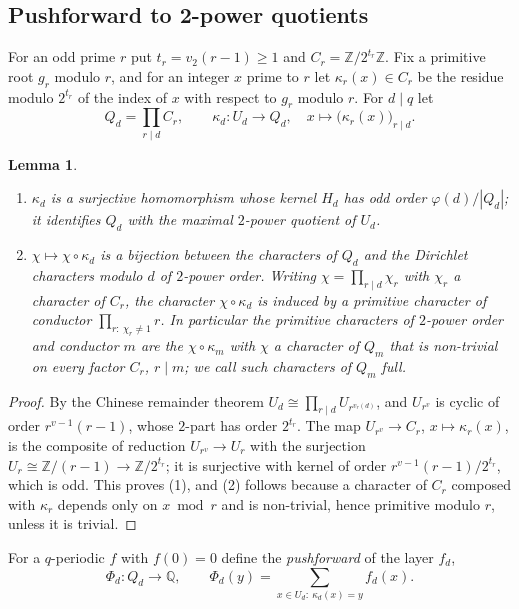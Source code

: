 \documentclass[11pt]{amsart}
\newtheorem{lemma}[theorem]{Lemma}
\theoremstyle{definition}
\theoremstyle{remark}
\providecommand{\Q}{\mathbb Q}
\providecommand{\Z}{\mathbb Z}
\numberwithin{equation}{section}
\begin{document}
\subsection{Pushforward to 2-power quotients}
For an odd prime $r$ put $t_r=v_2(r-1)\ge1$ and $C_r=\Z/2^{t_r}\Z$.
Fix a primitive root $g_r$ modulo $r$, and for an integer $x$ prime to $r$ let $\kappa_r(x)\in C_r$ be the residue modulo $2^{t_r}$ of the index of $x$ with respect to $g_r$ modulo $r$.
For $d\mid q$ let
\[
Q_d=\prod_{r\mid d}C_r,\qquad \kappa_d\colon U_d\to Q_d,\quad x\mapsto\bigl(\kappa_r(x)\bigr)_{r\mid d}.
\]

\begin{lemma}\label{lem:quotient}
\begin{enumerate}
\item $\kappa_d$ is a surjective homomorphism whose kernel $H_d$ has odd order $\varphi(d)/|Q_d|$; it identifies $Q_d$ with the maximal $2$-power quotient of $U_d$.
\item $\chi\mapsto\chi\circ\kappa_d$ is a bijection between the characters of $Q_d$ and the Dirichlet characters modulo $d$ of $2$-power order.
Writing $\chi=\prod_{r\mid d}\chi_r$ with $\chi_r$ a character of $C_r$, the character $\chi\circ\kappa_d$ is induced by a primitive character of conductor $\prod_{r:\ \chi_r\neq1}r$.
In particular the primitive characters of $2$-power order and conductor $m$ are the $\chi\circ\kappa_m$ with $\chi$ a character of $Q_m$ that is non-trivial on every factor $C_r$, $r\mid m$; we call such characters of $Q_m$ \emph{full}.
\end{enumerate}
\end{lemma}

\begin{proof}
By the Chinese remainder theorem $U_d\cong\prod_{r\mid d}U_{r^{v_r(d)}}$, and $U_{r^v}$ is cyclic of order $r^{v-1}(r-1)$, whose $2$-part has order $2^{t_r}$.
The map $U_{r^v}\to C_r$, $x\mapsto\kappa_r(x)$, is the composite of reduction $U_{r^v}\to U_r$ with the surjection $U_r\cong\Z/(r-1)\to\Z/2^{t_r}$; it is surjective with kernel of order $r^{v-1}(r-1)/2^{t_r}$, which is odd.
This proves (1), and (2) follows because a character of $C_r$ composed with $\kappa_r$ depends only on $x\bmod r$ and is non-trivial, hence primitive modulo $r$, unless it is trivial.
\end{proof}

For a $q$-periodic $f$ with $f(0)=0$ define the \emph{pushforward} of the layer $f_d$,
\[
\Phi_d\colon Q_d\to\Q,\qquad \Phi_d(y)=\sum_{x\in U_d:\ \kappa_d(x)=y}f_d(x).
\]
\end{document}

